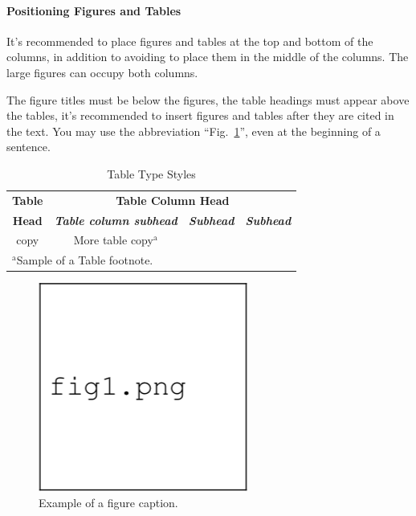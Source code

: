 \documentclass[letterpaper, 10pt, conference]{IEEEtran} %
\begin{document}
	\paragraph{Positioning Figures and Tables} It's recommended to place figures and tables at the top and bottom of the columns, in addition to avoiding to place them in the middle of the columns. The large figures can occupy both columns.
	
	The figure titles must be below the figures, the table headings must appear above the tables, it's recommended to insert figures and tables after they are cited in the text. You may use the abbreviation ``Fig.~\ref{exampleOfFigure}'', even at the beginning of a sentence.
	
	\begin{table}[htbp]
		\caption{Table Type Styles}
		\begin{center}
			\begin{tabular}{|c|c|c|c|}
				\hline
				\textbf{Table} & \multicolumn{3}{|c|}{\textbf{Table Column Head}} \\
				\cline{2-4}
				\textbf{Head} & \textbf{\textit{Table column subhead}} & \textbf{\textit{Subhead}} & \textbf{\textit{Subhead}} \\
				\hline
				copy & More table copy$^{\mathrm{a}}$ & & \\
				\hline
				\multicolumn{4}{l}{$^{\mathrm{a}}$Sample of a Table footnote.}
			\end{tabular}
			\label{exampleOfTable}
		\end{center}
	\end{table}
	
	\begin{figure}[htbp]
		\centerline{\includegraphics{Figures/Figure1.png}}
		\caption{Example of a figure caption.}
		\label{exampleOfFigure}
	\end{figure}
	
\end{document}
